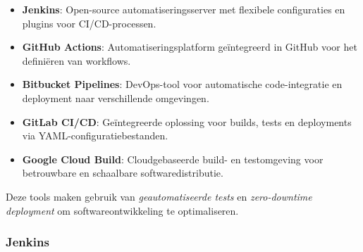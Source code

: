 \begin{itemize}
    \item \textbf{Jenkins}: Open-source automatiseringsserver met flexibele configuraties en plugins voor CI/CD-processen.
    \item \textbf{GitHub Actions}: Automatiseringsplatform geïntegreerd in GitHub voor het definiëren van workflows.
    \item \textbf{Bitbucket Pipelines}: DevOps-tool voor automatische code-integratie en deployment naar verschillende omgevingen.
    \item \textbf{GitLab CI/CD}: Geïntegreerde oplossing voor builds, tests en deployments via YAML-configuratiebestanden.
    \item \textbf{Google Cloud Build}: Cloudgebaseerde build- en testomgeving voor betrouwbare en schaalbare softwaredistributie.
\end{itemize}

Deze tools maken gebruik van \textit{geautomatiseerde tests} en \textit{zero-downtime deployment} om softwareontwikkeling te optimaliseren.

\subsubsection{Jenkins}

